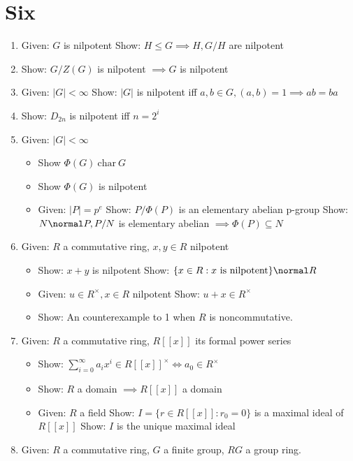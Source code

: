 \hypertarget{six}{%
\section{Six}\label{six}}

\begin{enumerate}
\def\labelenumi{\arabic{enumi}.}
\item
  Given: \(G\) is nilpotent Show: \(H \leq G \implies H, G/H\) are
  nilpotent
\item
  Show: \(G/Z(G)\) is nilpotent \(\implies G\) is nilpotent
\item
  Given: \(|G| < \infty\) Show: \(|G|\) is nilpotent iff
  \(a,b\in G, (a,b)=1 \implies ab=ba\)
\item
  Show: \(D_{2n}\) is nilpotent iff \(n = 2^{i}\)
\item
  Given: \(|G| < \infty\)

  \begin{itemize}
  \tightlist
  \item
    Show \(\Phi(G)~\text{char}~ G\)
  \item
    Show \(\Phi(G)\) is nilpotent
  \item
    Given: \(|P| = p^e\) Show: \(P / \Phi(P)\) is an elementary abelian
    p-group Show:\(N \normal P, P/N\) is elementary abelian
    \(\implies \Phi(P) \subseteq N\)
  \end{itemize}
\item
  Given: \(R\) a commutative ring, \(x,y \in R\) nilpotent

  \begin{itemize}
  \tightlist
  \item
    Show: \(x+y\) is nilpotent Show:
    \(\{x\in R : x \text{ is nilpotent}\} \normal R\)
  \item
    Given: \(u\in R^\times, x\in R\) nilpotent Show: \(u+x\in R^\times\)
  \item
    Show: An counterexample to 1 when \(R\) is noncommutative.
  \end{itemize}
\item
  Given: \(R\) a commutative ring, \(R[[x]]\) its formal power series

  \begin{itemize}
  \tightlist
  \item
    Show:
    \(\sum_{i=0}^\infty a_i x^i \in R[[x]]^\times \iff a_0 \in R^\times\)
  \item
    Show: \(R\) a domain \(\implies R[[x]]\) a domain
  \item
    Given: \(R\) a field Show: \(I = \{ r \in R[[x]] : r_0 = 0\}\) is a
    maximal ideal of \(R[[x]]\) Show: \(I\) is the unique maximal ideal
  \end{itemize}
\item
  Given: \(R\) a commutative ring, \(G\) a finite group, \(RG\) a group
  ring.


\end{enumerate}
